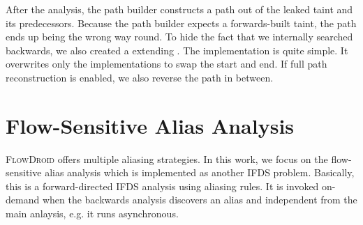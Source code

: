 \documentclass[../draft.tex]{subfiles}
\begin{document}
    After the analysis, the path builder constructs a path out of the leaked taint and its predecessors. Because the path builder expects a forwards-built taint, the path ends up being the wrong way round. To hide the fact that we internally searched backwards, we also created a  extending . The implementation is quite simple. It overwrites only the  implementations to swap the start and end. If full path reconstruction is enabled, we also reverse the path in between.

    \section{Flow-Sensitive Alias Analysis}\label{s:aliasing}
    \textsc{FlowDroid} offers multiple aliasing strategies.
    In this work, we focus on the flow-sensitive alias analysis which is implemented as another IFDS problem. Basically, this is a forward-directed IFDS analysis using aliasing rules. It is invoked on-demand when the backwards analysis discovers an alias and independent from the main anlaysis, e.g. it runs asynchronous. 
\end{document}
